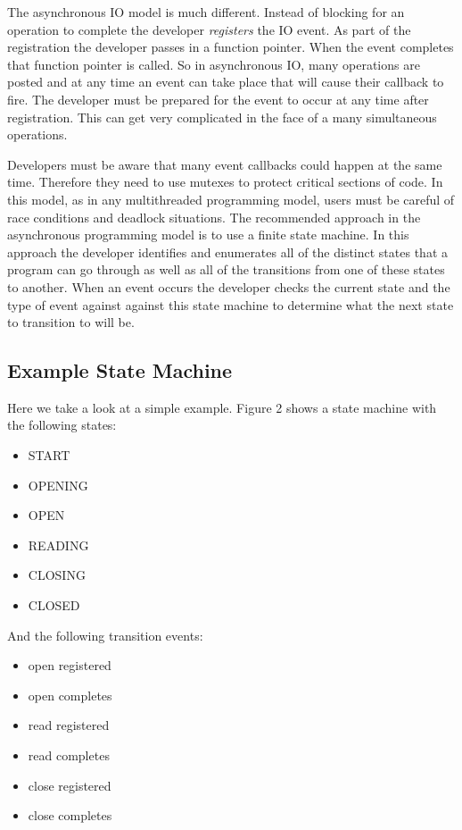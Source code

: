 \documentclass[11pt]{article}
\begin{document}
The asynchronous IO model is much different.  Instead of blocking
for an operation to complete the developer \emph{registers} the IO event.
As part of the registration the developer passes in a function pointer.
When the event completes that function pointer is called.  So in 
asynchronous IO, many operations are posted and at any time an event
can take place that will cause their callback to fire.  The developer
must be prepared for the event to occur at any time after registration.
This can get very complicated in the face of a many simultaneous
operations.

Developers must be aware that many event callbacks could happen at the same
time.  Therefore they need to use mutexes to protect critical sections
of code.  In this model, as in any multithreaded programming model,
users must be careful of race conditions and deadlock situations.
The recommended approach in the asynchronous programming model is 
to use a finite state machine.  In this approach the developer 
identifies and enumerates all of the distinct states that a program 
can go through as well as all of the transitions from one of these
states to another.  When an event occurs the developer checks the current
state and the type of event against against this state machine to determine
what the next state to transition to will be.

\subsection{Example State Machine}
Here we take a look at a simple example.  Figure 2 shows a state machine
with the following states:
\begin{itemize}
\item START
\item OPENING
\item OPEN
\item READING
\item CLOSING
\item CLOSED
\end{itemize}

And the following transition events:
\begin{itemize}
\item open registered
\item open completes
\item read registered
\item read completes
\item close registered
\item close completes
\end{itemize}
\end{document}
